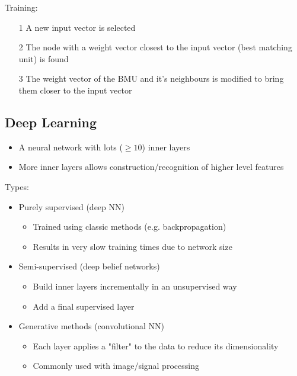 \documentclass[a4paper]{article}
\begin{document}
Training:

\begin{enumerate}
  \item[1] A new input vector is selected
  \item[2] The node with a weight vector closest to the input vector (best
           matching unit) is found
  \item[3] The weight vector of the BMU and it's neighbours is modified to
           bring them closer to the input vector
\end{enumerate}

\subsection{Deep Learning}

\begin{itemize}
  \item A neural network with lots ($\geq 10$) inner layers
  \item More inner layers allows construction/recognition of higher level
        features
\end{itemize}

Types:

\begin{itemize}
  \item Purely supervised (deep NN)
    \begin{itemize}
      \item Trained using classic methods (e.g. backpropagation)
      \item Results in very slow training times due to network size
    \end{itemize}

  \item Semi-supervised (deep belief networks)
    \begin{itemize}
      \item Build inner layers incrementally in an unsupervised way
      \item Add a final supervised layer
    \end{itemize}

  \item Generative methods (convolutional NN)
    \begin{itemize}
      \item Each layer applies a "filter" to the data to reduce its
            dimensionality
      \item Commonly used with image/signal processing
    \end{itemize}
\end{itemize}
\end{document}
